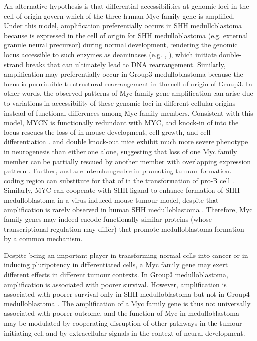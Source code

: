 An alternative hypothesis is that differential accessibilities at genomic loci in the cell of origin govern which of the three human Myc family gene is amplified. Under this model,  amplification preferentially occurs in SHH medulloblastoma because  is expressed in the cell of origin for SHH medulloblastoma (e.g. external granule neural precursor) during normal development, rendering the genomic locus accessible to such enzymes as deaminases (e.g. , ), which initiate double-strand breaks that can ultimately lead to DNA rearrangement. Similarly,  amplification may preferentially occur in Group3 medulloblastoma because the  locus is permissible to structural rearrangement in the cell of origin of Group3. In other words, the observed patterns of Myc family gene amplification can arise due to variations in accessibility of these genomic loci in different cellular origins instead of functional differences among Myc family members. Consistent with this model, MYCN is functionally redundant with MYC, and knock-in of  into the  locus rescues the loss of  in mouse development, cell growth, and cell differentiation .  and  double knock-out mice exhibit much more severe phenotype in neurogenesis than either one alone, suggesting that loss of one Myc family member can be partially rescued by another member with overlapping expression pattern . Further,  and  are interchangeable in promoting tumour formation:  coding region can substitute for that of  in the transformation of pro-B cell . Similarly, MYC can cooperate with SHH ligand to enhance formation of SHH medulloblastoma in a virus-induced mouse tumour model, despite that  amplification is rarely observed in human SHH medulloblastoma . Therefore, Myc family genes may indeed encode functionally similar proteins (whose transcriptional regulation may differ) that promote medulloblastoma formation by a common mechanism.

Despite being an important player in transforming normal cells into cancer or in inducing pluripotency in differentiated cells, a Myc family gene may exert different effects in different tumour contexts. In Group3 medulloblastoma,  amplification is associated with poorer survival. However,  amplification is associated with poorer survival only in SHH medulloblastoma but not in Group4 medulloblastoma . The amplification of a Myc family gene is thus not universally associated with poorer outcome, and the function of Myc in medulloblastoma may be modulated by cooperating disruption of other pathways in the tumour-initiating cell and by extracellular signals in the context of neural development.

